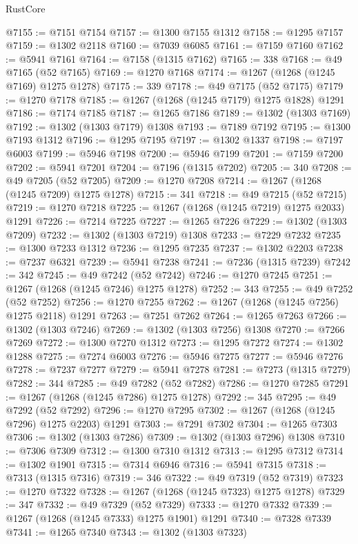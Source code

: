 \begin{lexlean}{RustCore}
\begin{coremodule}
@7155 := @7151 @7154
@7157 := @1300 @7155 @1312
@7158 := @1295 @7157
@7159 := @1302 @2118
@7160 := @7039 @6085
@7161 := @7159 @7160
@7162 := @5941 @7161
@7164 := @7158 (@1315 @7162)
@7165 := 338
@7168 := @49 @7165 (@52 @7165)
@7169 := @1270 @7168
@7174 := @1267 (@1268 (@1245 @7169) @1275 @1278)
@7175 := 339
@7178 := @49 @7175 (@52 @7175)
@7179 := @1270 @7178
@7185 := @1267 (@1268 (@1245 @7179) @1275 @1828) @1291
@7186 := @7174 @7185
@7187 := @1265 @7186
@7189 := @1302 (@1303 @7169)
@7192 := @1302 (@1303 @7179) @1308
@7193 := @7189 @7192
@7195 := @1300 @7193 @1312
@7196 := @1295 @7195
@7197 := @1302 @1337
@7198 := @7197 @6003
@7199 := @5946 @7198
@7200 := @5946 @7199
@7201 := @7159 @7200
@7202 := @5941 @7201
@7204 := @7196 (@1315 @7202)
@7205 := 340
@7208 := @49 @7205 (@52 @7205)
@7209 := @1270 @7208
@7214 := @1267 (@1268 (@1245 @7209) @1275 @1278)
@7215 := 341
@7218 := @49 @7215 (@52 @7215)
@7219 := @1270 @7218
@7225 := @1267 (@1268 (@1245 @7219) @1275 @2033) @1291
@7226 := @7214 @7225
@7227 := @1265 @7226
@7229 := @1302 (@1303 @7209)
@7232 := @1302 (@1303 @7219) @1308
@7233 := @7229 @7232
@7235 := @1300 @7233 @1312
@7236 := @1295 @7235
@7237 := @1302 @2203
@7238 := @7237 @6321
@7239 := @5941 @7238
@7241 := @7236 (@1315 @7239)
@7242 := 342
@7245 := @49 @7242 (@52 @7242)
@7246 := @1270 @7245
@7251 := @1267 (@1268 (@1245 @7246) @1275 @1278)
@7252 := 343
@7255 := @49 @7252 (@52 @7252)
@7256 := @1270 @7255
@7262 := @1267 (@1268 (@1245 @7256) @1275 @2118) @1291
@7263 := @7251 @7262
@7264 := @1265 @7263
@7266 := @1302 (@1303 @7246)
@7269 := @1302 (@1303 @7256) @1308
@7270 := @7266 @7269
@7272 := @1300 @7270 @1312
@7273 := @1295 @7272
@7274 := @1302 @1288
@7275 := @7274 @6003
@7276 := @5946 @7275
@7277 := @5946 @7276
@7278 := @7237 @7277
@7279 := @5941 @7278
@7281 := @7273 (@1315 @7279)
@7282 := 344
@7285 := @49 @7282 (@52 @7282)
@7286 := @1270 @7285
@7291 := @1267 (@1268 (@1245 @7286) @1275 @1278)
@7292 := 345
@7295 := @49 @7292 (@52 @7292)
@7296 := @1270 @7295
@7302 := @1267 (@1268 (@1245 @7296) @1275 @2203) @1291
@7303 := @7291 @7302
@7304 := @1265 @7303
@7306 := @1302 (@1303 @7286)
@7309 := @1302 (@1303 @7296) @1308
@7310 := @7306 @7309
@7312 := @1300 @7310 @1312
@7313 := @1295 @7312
@7314 := @1302 @1901
@7315 := @7314 @6946
@7316 := @5941 @7315
@7318 := @7313 (@1315 @7316)
@7319 := 346
@7322 := @49 @7319 (@52 @7319)
@7323 := @1270 @7322
@7328 := @1267 (@1268 (@1245 @7323) @1275 @1278)
@7329 := 347
@7332 := @49 @7329 (@52 @7329)
@7333 := @1270 @7332
@7339 := @1267 (@1268 (@1245 @7333) @1275 @1901) @1291
@7340 := @7328 @7339
@7341 := @1265 @7340
@7343 := @1302 (@1303 @7323)

\end{coremodule}
\end{lexlean}
